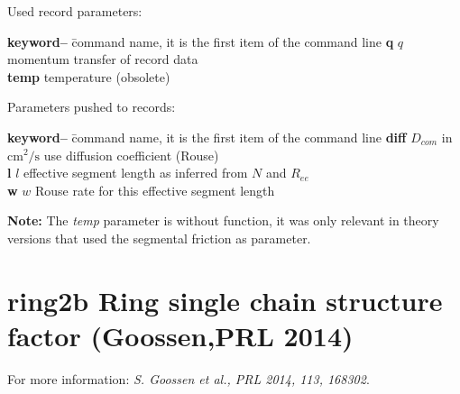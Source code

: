 \documentclass[11pt,fleqn]{book} %
\newcommand{\linespace}{\vspace{4ex}}
\newcommand{\desc}[1]{\hskip 0.5cm {\color{descgray} #1}}
\begin{document}
\linespace
Used record parameters: 
\begin{tabbing}
\textbf{keyword--}  \= command name, it is the first item of the command line                    \kill
\textbf{q   } \>  $q$ momentum transfer of record data         \\         
\textbf{temp } \> temperature (obsolete)        \\         
\end{tabbing}

\linespace
Parameters pushed to records:
\begin{tabbing}
\textbf{keyword--}  \= command name, it is the first item of the command line                    \kill
\textbf{diff} \>  $D_{com}$ in ${\mathrm{cm^2/s}}$ use diffusion coefficient (Rouse)  \\         
\textbf{l} \>  $l$ effective segment length as inferred from ${N}$ and ${R_{ee}}$         \\         
\textbf{w} \>  $w$ Rouse rate for this effective segment length         \\         
\end{tabbing}

\linespace
{\bf Note:} The \emph{temp} parameter is without function, it was only relevant in 
theory versions that used the segmental friction as parameter. 



\chapter{ring2b \desc{Ring single chain structure factor (Goossen,PRL 2014) }}

\linespace
For more information: {\it S. Goossen et al., PRL 2014, 113, 168302}.
\linespace
\end{document}
